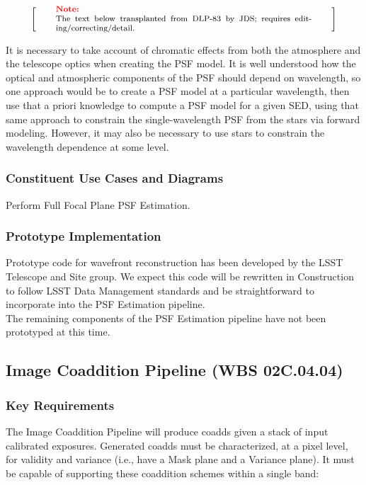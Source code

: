 \documentclass[12pt]{article}
\newcommand{\wbsCoadd}{WBS 02C.04.04}
\newenvironment{note}[1][Note]
{
  \begin{displaymath}
    \left[ \qquad
    \begin{minipage}[h]{.75\linewidth}
      \color{red} \footnotesize
      \textbf{#1:} \newline
      \color{black}
}
{
    \end{minipage}
    \normalsize
    \qquad \right]
  \end{displaymath}
}
\begin{document}
\begin{note}
The text below transplanted from DLP-83 by JDS; requires editing/correcting/detail.
\end{note}

It is necessary to take account of chromatic effects from both the atmosphere and the telescope optics when creating the PSF model. It is well understood how the optical and atmospheric components of the PSF should depend on wavelength, so one approach would be to create a PSF model at a particular wavelength, then use that a priori knowledge to compute a PSF model for a given SED, using that same approach to constrain the single-wavelength PSF from the stars via forward modeling. However, it may also be necessary to use stars to constrain the wavelength dependence at some level.

\subsubsection{Constituent Use Cases and Diagrams}

Perform Full Focal Plane PSF Estimation.

\subsubsection{Prototype Implementation}

Prototype code for wavefront reconstruction has been developed by the LSST Telescope and Site group. We expect this code will be rewritten in Construction to follow LSST Data Management standards and be straightforward to incorporate into the PSF Estimation pipeline.
\\

The remaining components of the PSF Estimation pipeline have not been prototyped at this time.

\clearpage

\subsection{Image Coaddition Pipeline (\wbsCoadd)}

\subsubsection{Key Requirements}

The Image Coaddition Pipeline will produce coadds given a stack of input calibrated exposures. Generated coadds must be characterized, at a pixel level, for validity and variance (i.e., have a Mask plane and a Variance plane). It must be capable of supporting these coaddition schemes within a single band:
\end{document}
